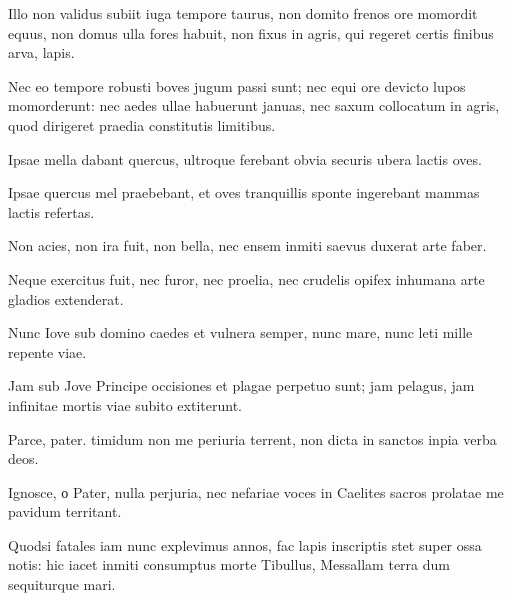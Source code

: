 {\large

\noindent Illo non validus subiit iuga tempore taurus, non domito frenos ore momordit equus, non domus ulla fores habuit, non fixus in agris, qui regeret certis finibus arva, lapis.\\

}


\noindent Nec eo tempore robusti boves jugum passi sunt; nec equi ore devicto lupos momorderunt: nec aedes ullae habuerunt januas, nec saxum collocatum in agris, quod dirigeret praedia constitutis limitibus. \\

{\large

\noindent Ipsae mella dabant quercus, ultroque ferebant obvia securis ubera lactis oves.\\

}


\noindent Ipsae quercus mel praebebant, et oves tranquillis sponte ingerebant mammas lactis refertas. \\

\newpage

{\large

\noindent Non acies, non ira fuit, non bella, nec ensem inmiti saevus duxerat arte faber.\\

}


\noindent Neque exercitus fuit, nec furor, nec proelia, nec crudelis opifex inhumana arte gladios extenderat. \\

{\large

\noindent Nunc Iove sub domino caedes et vulnera semper, nunc mare, nunc leti mille repente viae.\\

}


\noindent Jam sub Jove Principe occisiones et plagae perpetuo sunt; jam pelagus, jam infinitae mortis viae subito extiterunt. \\

{\large

\noindent Parce, pater. timidum non me periuria terrent, non dicta in sanctos inpia verba deos.\\

}


\noindent Ignosce, о Pater, nulla perjuria, nec nefariae voces in Caelites sacros prolatae me pavidum territant. \\

{\large

\noindent Quodsi fatales iam nunc explevimus annos, fac lapis inscriptis stet super ossa notis: hic iacet inmiti consumptus morte Tibullus, Messallam terra dum sequiturque mari.\\

}


